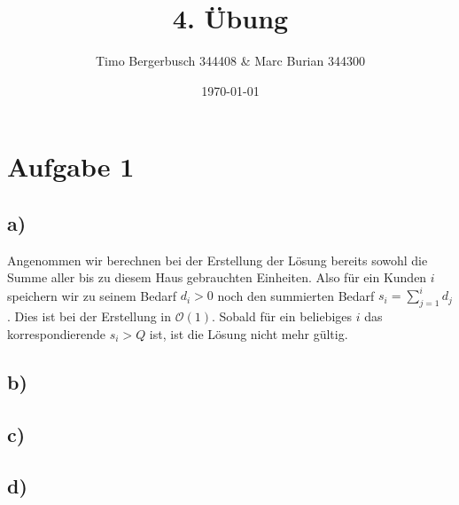 \documentclass[12pt]{article}
\begin{document}
	
	\title{4. Übung}
	\author{Timo Bergerbusch 344408 \& Marc Burian 344300}
	\date{\specialdate\today}
	\maketitle
	
	
	\section*{Aufgabe 1}
	\subsection*{a)}
	Angenommen wir berechnen bei der Erstellung der Lösung bereits sowohl die Summe aller bis zu diesem Haus gebrauchten Einheiten. Also für ein Kunden $i$ speichern wir zu seinem Bedarf $d_i>0$ noch den summierten Bedarf $s_i=\sum_{j=1}^{i}d_j$. Dies ist bei der Erstellung in $\mathcal{O}(1)$. Sobald für ein beliebiges $i$ das korrespondierende $s_i>Q$ ist, ist die Lösung nicht mehr gültig.\\
	
	
	\subsection*{b)}
	\subsection*{c)}
	\subsection*{d)}	
\end{document}
